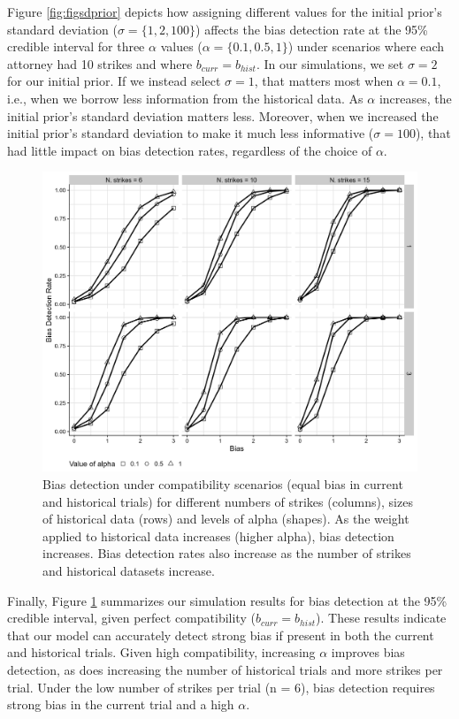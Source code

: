 \documentclass[12pt]{article}
\begin{document}
Figure \ref{fig:figsdprior} depicts how assigning different values for the initial prior's standard deviation (\(\sigma = \{1,2,100\}\)) affects the bias detection rate at the 95\% credible interval for three \(\alpha\) values (\(\alpha = \{0.1,0.5,1\}\)) under scenarios where each attorney had 10 strikes and where \(b_{curr} = b_{hist}\). In our simulations, we set \(\sigma = 2\) for our initial prior. If we instead select \(\sigma = 1\), that matters most when \(\alpha = 0.1\), i.e., when we borrow less information from the historical data. As \(\alpha\) increases, the initial prior's standard deviation matters less. Moreover, when we increased the initial prior's standard deviation to make it much less informative (\(\sigma = 100\)), that had little impact on bias detection rates, regardless of the choice of \(\alpha\).

\begin{figure}

{\centering \includegraphics[width=0.85\linewidth]{../figures/compatibility_plot} 

}

\caption{Bias detection under compatibility scenarios (equal bias in current and historical trials) for different numbers of strikes (columns), sizes of historical data (rows) and levels of alpha (shapes). As the weight applied to historical data increases (higher alpha), bias detection increases. Bias detection rates also increase as the number of strikes and historical datasets increase.}\label{fig:figcmptbly}
\end{figure}

Finally, Figure \ref{fig:figcmptbly} summarizes our simulation results for bias detection at the 95\% credible interval, given perfect compatibility (\(b_{curr} = b_{hist}\)). These results indicate that our model can accurately detect strong bias if present in both the current and historical trials. Given high compatibility, increasing \(\alpha\) improves bias detection, as does increasing the number of historical trials and more strikes per trial. Under the low number of strikes per trial (n = 6), bias detection requires strong bias in the current trial and a high \(\alpha\).
\end{document}
